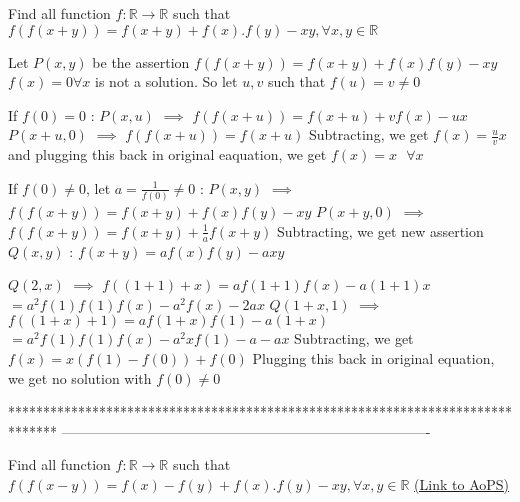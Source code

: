 \begin{solution}
	\begin{tcolorbox}Find all function $f : \mathbb{R} \to \mathbb{R}$ such that 
$f\left ( f\left ( x+y \right ) \right )=f\left ( x+y \right )+f(x).f(y)-xy  ,\forall x,y\in \mathbb{R}$\end{tcolorbox}
Let $P(x,y)$ be the assertion $f(f(x+y))=f(x+y)+f(x)f(y)-xy$
$f(x)=0$$\forall x$ is not a solution. So let $u,v$ such that $f(u)=v\ne 0$

If $f(0)=0$ :
$P(x,u)$ $\implies$ $f(f(x+u))=f(x+u)+vf(x)-ux$
$P(x+u,0)$ $\implies$ $f(f(x+u))=f(x+u)$
Subtracting, we get $f(x)=\frac uvx$ and plugging this back in original eaquation, we get $\boxed{f(x)=x\text{  }\forall x}$ 

If $f(0)\ne 0$, let $a=\frac 1{f(0)}\ne 0$ :
$P(x,y)$ $\implies$ $f(f(x+y))=f(x+y)+f(x)f(y)-xy$
$P(x+y,0)$ $\implies$ $f(f(x+y))=f(x+y)+\frac 1af(x+y)$
Subtracting, we get new assertion $Q(x,y)$ : $f(x+y)=af(x)f(y)-axy$

$Q(2,x)$ $\implies$ $f((1+1)+x)=af(1+1)f(x)-a(1+1)x$ $=a^2f(1)f(1)f(x)-a^2f(x)-2ax$
$Q(1+x,1)$ $\implies$ $f((1+x)+1)=af(1+x)f(1)-a(1+x)$ $=a^2f(1)f(1)f(x)-a^2xf(1)-a-ax$
Subtracting, we get $f(x)=x(f(1)-f(0))+f(0)$
Plugging this back in original equation, we get no solution with $f(0)\ne 0$
\end{solution}
*******************************************************************************
-------------------------------------------------------------------------------

\begin{problem}
	Find all function $f : \mathbb{R} \to \mathbb{R}$ such that 
$f\left ( f\left ( x-y \right ) \right )=f ( x )-f(y)+f(x).f(y)-xy  ,\forall x,y\in \mathbb{R}$
	\flushright \href{https://artofproblemsolving.com/community/c6h618320}{(Link to AoPS)}
\end{problem}



